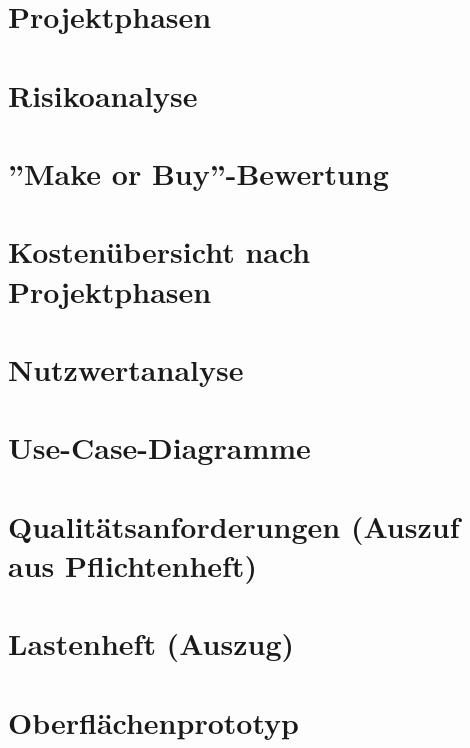 \begin{appendices}

	
	\section{Projektphasen}		
		
		\newpage

	\section{Risikoanalyse}		
		
		\newpage		
		
	\section{''Make or Buy''-Bewertung}		
		
		\newpage
	
	\section{Kostenübersicht nach Projektphasen}		
		
		\newpage

	\section{Nutzwertanalyse}		
		
		\newpage
		
	\section{Use-Case-Diagramme}		
		
		\newpage		
		
	\section{Qualitätsanforderungen (Auszuf aus Pflichtenheft)}		
		
		\newpage
		
	\section{Lastenheft (Auszug)}
		
		\newpage
		
\section{Oberflächenprototyp}
		
		\newpage
		
\end{appendices}